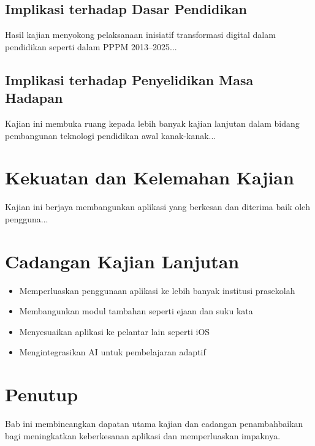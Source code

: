 \documentclass[12pt]{report}
\begin{document}
\subsection{Implikasi terhadap Dasar Pendidikan}
Hasil kajian menyokong pelaksanaan inisiatif transformasi digital dalam pendidikan seperti dalam PPPM 2013–2025...

\subsection{Implikasi terhadap Penyelidikan Masa Hadapan}
Kajian ini membuka ruang kepada lebih banyak kajian lanjutan dalam bidang pembangunan teknologi pendidikan awal kanak-kanak...

\section{Kekuatan dan Kelemahan Kajian}
Kajian ini berjaya membangunkan aplikasi yang berkesan dan diterima baik oleh pengguna...

\section{Cadangan Kajian Lanjutan}
\begin{itemize}
  \item Memperluaskan penggunaan aplikasi ke lebih banyak institusi prasekolah
  \item Membangunkan modul tambahan seperti ejaan dan suku kata
  \item Menyesuaikan aplikasi ke pelantar lain seperti iOS
  \item Mengintegrasikan AI untuk pembelajaran adaptif
\end{itemize}

\section{Penutup}
Bab ini membincangkan dapatan utama kajian dan cadangan penambahbaikan bagi meningkatkan keberkesanan aplikasi dan memperluaskan impaknya.
\end{document}
